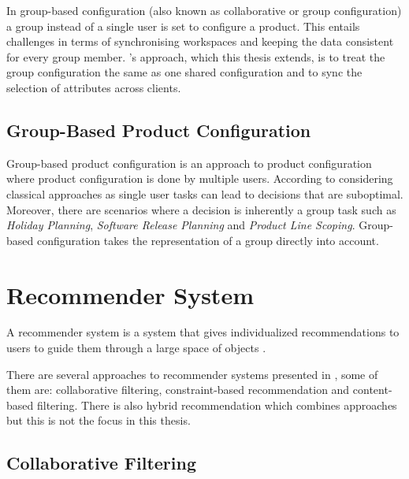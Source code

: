 In group-based configuration (also known as collaborative or group configuration) a group instead of a single user is set to configure a product. This entails challenges in terms of synchronising  workspaces and keeping the data consistent for every group member. \citeauthor{raabKollaborativeProduktkonfigurationEchtzeit2019}'s \cite{raabKollaborativeProduktkonfigurationEchtzeit2019} approach, which this thesis extends, is to treat the group configuration the same as one shared configuration and to sync the selection of attributes across clients.

\subsection{Group-Based Product Configuration}
\label{sec:Foundations:GroupBasedProductConfiguration}

Group-based product configuration is an approach to product configuration where product configuration is done by multiple users. According to \citeauthor{felferningGroupBasedConfiguration2016} \cite{felferningGroupBasedConfiguration2016} considering classical approaches as single user tasks can lead to decisions that are suboptimal. Moreover, there are scenarios where a decision is inherently a group task such as \emph{Holiday Planning}, \emph{Software Release Planning} and \emph{Product Line Scoping}. Group-based configuration takes the representation of a group directly into account.

\section{Recommender System}
\label{sec:Foundations:RecommenderSystem}

A recommender system is a system that gives individualized recommendations to users to guide them through a large space of objects \cite[~ p. 331]{burkeHybridRecommenderSystems2002}.

There are several approaches to recommender systems presented in \cite{felfernigGroupRecommenderSystems2018}, some of them are: collaborative filtering, constraint-based recommendation and content-based filtering. There is also hybrid recommendation which combines approaches but this is not the focus in this thesis.

\subsection{Collaborative Filtering}

